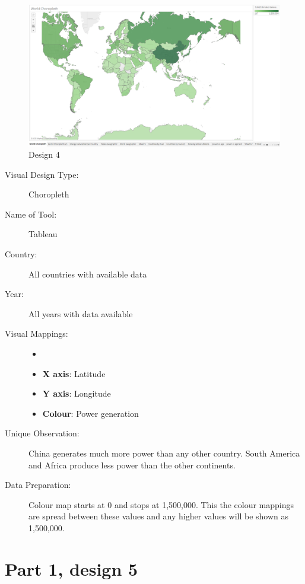 \documentclass{article}
\begin{document}
\begin{figure}[ht]
\centering
\includegraphics[scale=0.3]{World-Choropleth.PNG}
\caption{Design 4}
\end{figure}

\begin{description}
\item[Visual Design Type:]
Choropleth
\item[Name of Tool:]
Tableau
\item[Country:]
All countries with available data
\item[Year:]
All years with data available
\item[Visual Mappings:]
\begin{itemize}
    \item[]
    \item \textbf{X axis}: Latitude
    \item \textbf{Y axis}: Longitude
    \item \textbf{Colour}: Power generation 
    
\end{itemize} 
\item[Unique Observation:]
China generates much more power than any other country. 
South America and Africa produce less power than the other continents.
\item[Data Preparation:]
Colour map starts at 0 and stops at 1,500,000. 
This the colour mappings are spread between these values and any higher values will be shown as 1,500,000.

\end{description}


\section*{Part 1, design 5}
\end{document}

